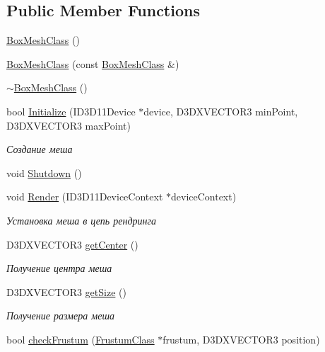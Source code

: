 \subsection*{Public Member Functions}
\begin{DoxyCompactItemize}
\item 
\hyperlink{group___meshes_gabc9d6020c66652ae6e3242ec85ae4663}{Box\+Mesh\+Class} ()
\item 
\hyperlink{group___meshes_ga92cfbdfdf9c487040a8dab0f9a2974a1}{Box\+Mesh\+Class} (const \hyperlink{class_box_mesh_class}{Box\+Mesh\+Class} \&)
\item 
\hyperlink{group___meshes_ga610c8c0a85ea53728654d748336404e5}{$\sim$\+Box\+Mesh\+Class} ()
\item 
bool \hyperlink{group___meshes_gafb74aab48557e9c4e0ecc532b87b9a5c}{Initialize} (I\+D3\+D11\+Device $\ast$device, D3\+D\+X\+V\+E\+C\+T\+O\+R3 min\+Point, D3\+D\+X\+V\+E\+C\+T\+O\+R3 max\+Point)
\begin{DoxyCompactList}\small\item\em Создание меша \end{DoxyCompactList}\item 
void \hyperlink{group___meshes_ga93bf13a26ba0fce8444d818e89c04508}{Shutdown} ()
\item 
void \hyperlink{group___meshes_ga166a0bcded8a30e29d84b924bb94512f}{Render} (I\+D3\+D11\+Device\+Context $\ast$device\+Context)
\begin{DoxyCompactList}\small\item\em Установка меша в цепь рендринга \end{DoxyCompactList}\item 
D3\+D\+X\+V\+E\+C\+T\+O\+R3 \hyperlink{group___meshes_ga178f792d827e1853667fdf7936329eaf}{get\+Center} ()
\begin{DoxyCompactList}\small\item\em Получение центра меша \end{DoxyCompactList}\item 
D3\+D\+X\+V\+E\+C\+T\+O\+R3 \hyperlink{group___meshes_ga50bc67b50cc0a3c7a38d2893c5fae07e}{get\+Size} ()
\begin{DoxyCompactList}\small\item\em Получение размера меша \end{DoxyCompactList}\item 
bool \hyperlink{group___meshes_gac780e22baf0b7e6683121ded18a40b76}{check\+Frustum} (\hyperlink{class_frustum_class}{Frustum\+Class} $\ast$frustum, D3\+D\+X\+V\+E\+C\+T\+O\+R3 position)

\end{DoxyCompactItemize}
